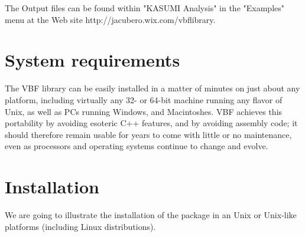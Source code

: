 The Output files can be found within "KASUMI Analysis" in the "Examples" menu at the Web site http://jacubero.wix.com/vbflibrary.

\section{System requirements}\label{sec:System_requirements}

The VBF library can be easily installed in a matter of minutes on just about
any platform, including virtually any 32- or 64-bit machine running any flavor
of Unix, as well as PCs running Windows, and Macintoshes. VBF achieves this
portability by avoiding esoteric C++ features, and by avoiding assembly code;
it should therefore remain usable for years to come with little or no
maintenance, even as processors and operating systems continue to change and
evolve.

\section{Installation}\label{sec:Installation}

We are going to illustrate the installation of the package in an Unix or Unix-like platforms (including Linux distributions). 

